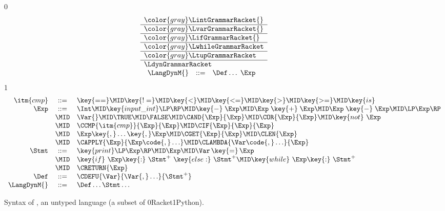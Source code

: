 \documentclass[7x10]{TimesAPriori_MIT}%
\newcommand{\gray}[1]{{\color{gray} #1}}
\def\racketEd{0}
\def\pythonEd{1}
\providecommand{\BookEdition}{1}
\let\edition\BookEdition
\newcommand{\racket}[1]{{\if\edition\racketEd{#1}\fi}}
\newcommand{\pythonColor}[0]{}
\newcommand{\python}[1]{{\if\edition\pythonEd\pythonColor #1\fi}}
\numberwithin{theorem}{chapter}
\numberwithin{definition}{chapter}
\numberwithin{equation}{chapter}
\begin{document}
\begin{figure}[tp]
  \centering
  \begin{tcolorbox}[colback=white]  
    \small
{\if\edition\racketEd    
\[
\begin{array}{l}
  \gray{\LintGrammarRacket{}} \\ \hline
  \gray{\LvarGrammarRacket{}} \\ \hline
  \gray{\LifGrammarRacket{}} \\ \hline
  \gray{\LwhileGrammarRacket} \\ \hline
  \gray{\LtupGrammarRacket} \\ \hline
  \LdynGrammarRacket \\
\begin{array}{rcl}
\LangDynM{}  &::=& \Def\ldots\; \Exp
\end{array}
\end{array}
\]
\fi}
{\if\edition\pythonEd\pythonColor
\[
\begin{array}{rcl}
  \itm{cmp} &::= & \key{==} \MID \key{!=} \MID \key{<} \MID \key{<=} \MID \key{>} \MID \key{>=} \MID \key{is} \\
  \Exp &::=& \Int \MID \key{input\_int}\LP\RP \MID \key{-}\;\Exp \MID \Exp \; \key{+} \; \Exp \MID \Exp \; \key{-} \; \Exp \MID \LP\Exp\RP \\
  &\MID& \Var{} \MID \TRUE \MID \FALSE \MID \CAND{\Exp}{\Exp}
  \MID \COR{\Exp}{\Exp} \MID \key{not}~\Exp \\
  &\MID& \CCMP{\itm{cmp}}{\Exp}{\Exp}
      \MID \CIF{\Exp}{\Exp}{\Exp} \\
  &\MID& \Exp \key{,} \ldots \key{,} \Exp \MID \CGET{\Exp}{\Exp}
      \MID \CLEN{\Exp}  \\
   &\MID& \CAPPLY{\Exp}{\Exp\code{,} \ldots} 
    \MID \CLAMBDA{\Var\code{, }\ldots}{\Exp}\\
  \Stmt &::=& \key{print}\LP \Exp \RP \MID \Exp 
    \MID \Var\mathop{\key{=}}\Exp \\
   &\MID& \key{if}~ \Exp \key{:}~ \Stmt^{+} ~\key{else:}~ \Stmt^{+} 
   \MID \key{while}~ \Exp \key{:}~ \Stmt^{+} \\
    &\MID& \CRETURN{\Exp} \\
   \Def &::=& \CDEFU{\Var}{\Var{,} \ldots}{\Stmt^{+}} \\
  \LangDynM{} &::=& \Def\ldots \Stmt\ldots
\end{array}
\]
\fi}
  \end{tcolorbox}
\caption{Syntax of \LangDyn{}, an untyped language (a subset of \racket{Racket}\python{Python}).}
\label{fig:r7-concrete-syntax}
\end{figure}
\end{document}
